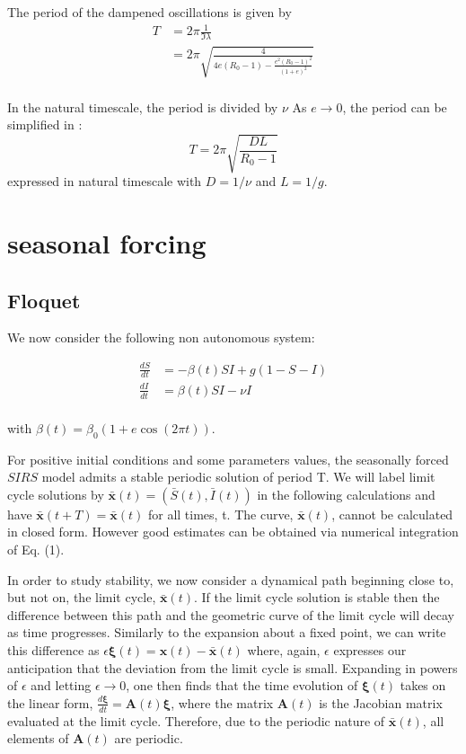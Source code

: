 \documentclass[12pt]{article}
\begin{document}
The period of the dampened oscillations is given by 
\begin{align*}
  T & =2\pi \frac{1}{\Im{\lambda}} \\
& = 2\pi \sqrt{\frac{4}{4 e (R_0-1)-\frac{e^2(R_0-1)^2}{(1+e)^2}}} \\
\end{align*}

In the natural timescale, the period is divided by $\nu$
As $e \to 0$, the period can be simplified in :
$$T=2 \pi \sqrt{\frac{DL}{R_0-1}}$$ expressed in natural timescale with $D=1/\nu$ and $L=1/g$.

\section{seasonal forcing}

\subsection{Floquet}

We now consider the following non autonomous system:

\begin{align*}
  \frac{dS}{dt} & = -\beta(t) S I + g (1-S-I)\\
  \frac{dI}{dt} & = \beta(t) S I - \nu I\\
\end{align*}

with $\beta(t)=\beta_0(1+e \cos(2 \pi t))$.



For positive initial conditions and some parameters values, the seasonally forced $SIRS$ model admits a stable periodic solution of period T.
We will label limit cycle solutions by $\mathbf{\bar{x}}(t) = (\bar{S}(t), \bar{I}(t))$ in the following calculations and have $\mathbf{\bar{x}}(t + T ) = \mathbf{\bar{x}}(t)$ for all times, t. 
The curve, $\mathbf{\bar{x}}(t)$, cannot be calculated in closed form. However good estimates can be obtained via numerical integration of Eq. (1).

In order to study stability, we now consider a dynamical path beginning close to, but not on, the limit cycle, $\mathbf{\bar{x}}(t)$. If the limit cycle solution is stable then the difference between this path and the geometric curve of the limit cycle will decay as time progresses.  Similarly to the expansion about a fixed point, we can write this difference as $\epsilon \mathbf{\xi}(t) = \mathbf{x}(t) - \mathbf{\bar{x}}(t)$  where, again, $\epsilon$ expresses our anticipation that the deviation from the limit cycle is small. Expanding in powers of $\epsilon$ and letting $\epsilon \to 0$, one then finds that the time evolution of $\mathbf{\xi}(t)$ takes on the linear form, $\frac{d\mathbf{\xi}}{dt} = \mathbf{A}(t) \mathbf{\xi}$, where the matrix $\mathbf{A}(t)$ is the Jacobian matrix evaluated at the limit cycle. 
Therefore, due to the periodic nature of $\mathbf{\bar{x}}(t)$, all elements of $\mathbf{A}(t)$ are periodic.
\end{document}
